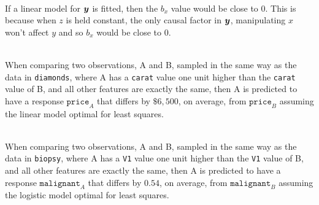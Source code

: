 \documentclass[12pt]{article}
\begin{document}
\begin{enumerate}
 \\
If a linear model for $\boldsymbol{y}$ is fitted, then the $b_x$ value would be close to $0$.  This is because when $z$ is held constant, the only causal factor in $\boldsymbol{y}$, manipulating $x$ won't affect $y$ and so $b_x$ would be close to $0$. 


\newpage
{} \\ 
When comparing two observations, A and B, sampled in the same way as the data in \texttt{diamonds}, where A has a \texttt{carat} value one unit higher than the \texttt{carat} value of B, and all other features are exactly the same, then A is predicted to have a response $\texttt{price}_A$ that differs by $\$6,500$, on average, from $\texttt{price}_B$ assuming the linear model optimal for least squares. 

 \\
When comparing two observations, A and B, sampled in the same way as the data in \texttt{biopsy}, where A has a \texttt{V1} value one unit higher than the \texttt{V1} value of B, and all other features are exactly the same, then A is predicted to have a response $\texttt{malignant}_A$ that differs by $0.54$, on average, from $\texttt{malignant}_B$ assuming the logistic model optimal for least squares. 

\end{enumerate}
\end{document}
